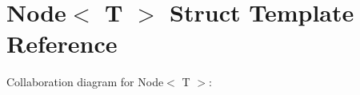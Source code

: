 \hypertarget{struct_node}{}\section{Node$<$ T $>$ Struct Template Reference}
\label{struct_node}


Collaboration diagram for Node$<$ T $>$\+:
